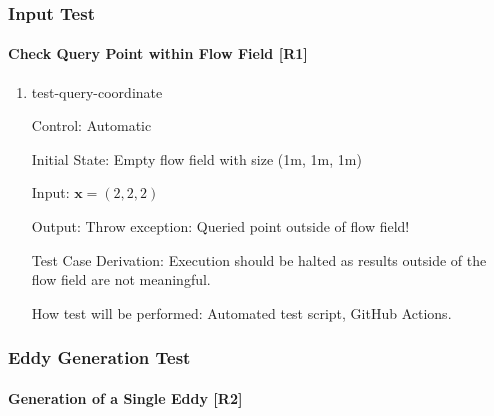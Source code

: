 \documentclass[12pt, titlepage]{article}
\begin{document}
\subsubsection{Input Test} \label{ST:Input}


		
\paragraph{Check Query Point within Flow Field [R1]}

\begin{enumerate}

\item{test-query-coordinate\\}

Control: Automatic
					
Initial State: Empty flow field with size (1m, 1m, 1m)
					
Input: $\mathbf{x}=(2,2,2)$
					
Output: Throw exception: Queried point outside of flow field!

Test Case Derivation: Execution should be halted as results outside of the flow field are not meaningful.
					
How test will be performed: Automated test script, GitHub Actions.

\end{enumerate}

\newpage
\subsubsection{Eddy Generation Test} \label{ST:EddyGen}
\paragraph{Generation of a Single Eddy [R2]}
\end{document}
